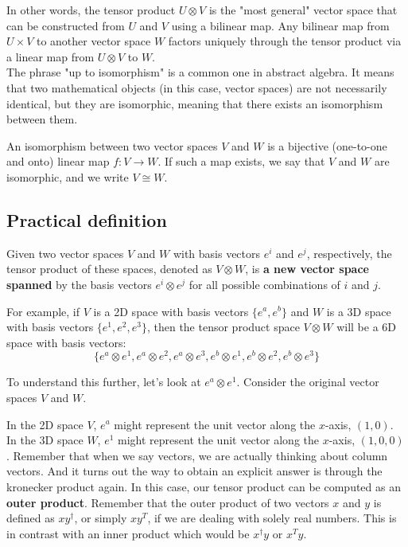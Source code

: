 In other words, the tensor product $U \otimes V$ is the "most general" vector space that can be constructed
from $U$ and $V$ using a bilinear map.
Any bilinear map from $U \times V$ to another vector space $W$ factors uniquely through the tensor product
via a linear map from $U \otimes V$ to $W$.
\\

The phrase "up to isomorphism" is a common one in abstract algebra.
It means that two mathematical objects (in this case, vector spaces) are not necessarily identical,
but they are isomorphic, meaning that there exists an isomorphism between them.

An isomorphism between two vector spaces $V$ and $W$ is a bijective (one-to-one and onto)
linear map $f: V \to W$.
If such a map exists, we say that $V$ and $W$ are isomorphic, and we write $V \cong W$.





\subsection{Practical definition}

Given two vector spaces $V$ and $W$ with basis vectors $e^i$ and $e^j$,
respectively, the tensor product of these spaces, denoted as $V \otimes W$,
is \textbf{a new vector space spanned} by the basis vectors $e^i \otimes e^j$ 
for all possible combinations of $i$ and $j$.

For example, if $V$ is a 2D space with basis vectors $\{e^a, e^b\}$ and
$W$ is a 3D space with basis vectors $\{e^1, e^2, e^3 \}$,
then the tensor product space $V \otimes W$ will be a 6D space with basis vectors:
$$
\{e^a \otimes e^1, e^a \otimes e^2, e^a \otimes e^3, e^b \otimes e^1, e^b \otimes e^2, e^b \otimes e^3\}
$$

To understand this further, let's look at $e^a \otimes e^1$.
Consider the original vector spaces $V$ and $W$.

In the 2D space $V$, $e^a$ might represent the unit vector along the $x$-axis, $(1, 0)$.
In the 3D space $W$, $e^1$ might represent the unit vector along the $x$-axis, $(1, 0, 0)$.
Remember that when we say vectors, we are actually thinking about column vectors.
And it turns out the way to obtain an explicit answer is through the kronecker product again.
In this case, our tensor product can be computed as an \textbf{outer product}.
Remember that the outer product of two vectors $x$ and $y$ is defined as $xy^\dagger$, or
simply $xy^T$, if we are dealing with solely real numbers.
This is in contrast with an inner product which would be $x^\dagger y$ or $x^T y$.

